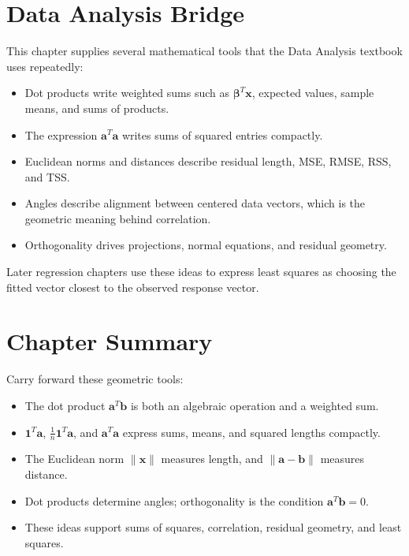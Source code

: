 \section{Data Analysis Bridge}
\label{mf:ch05-data-analysis-bridge}

This chapter supplies several mathematical tools that the Data Analysis textbook uses repeatedly:
\begin{itemize}
    \item Dot products write weighted sums such as \(\boldsymbol{\beta}^T\mathbf{x}\), expected values, sample means, and sums of products.
    \item The expression \(\mathbf{a}^T\mathbf{a}\) writes sums of squared entries compactly.
    \item Euclidean norms and distances describe residual length, MSE, RMSE, RSS, and TSS.
    \item Angles describe alignment between centered data vectors, which is the geometric meaning behind correlation.
    \item Orthogonality drives projections, normal equations, and residual geometry.
\end{itemize}
Later regression chapters use these ideas to express least squares as choosing the fitted vector closest to the observed response vector.

\section{Chapter Summary}
\label{mf:dot-products-summary}

Carry forward these geometric tools:
\begin{itemize}
    \item The dot product \(\mathbf{a}^T\mathbf{b}\) is both an algebraic operation and a weighted sum.
    \item \(\mathbf{1}^T\mathbf{a}\), \(\frac{1}{n}\mathbf{1}^T\mathbf{a}\), and \(\mathbf{a}^T\mathbf{a}\) express sums, means, and squared lengths compactly.
    \item The Euclidean norm \(\|\mathbf{x}\|\) measures length, and \(\|\mathbf{a}-\mathbf{b}\|\) measures distance.
    \item Dot products determine angles; orthogonality is the condition \(\mathbf{a}^T\mathbf{b}=0\).
    \item These ideas support sums of squares, correlation, residual geometry, and least squares.
\end{itemize}
